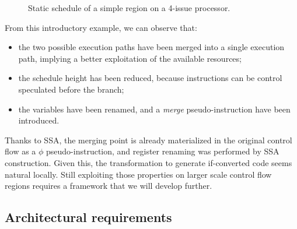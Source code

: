 \begin{figure}
\caption{Static schedule of a simple region on a 4-issue processor. }
\label{fig:example1}
\end{figure}

From this introductory example, we can observe that:
\begin{itemize}
\item the two possible execution paths have been merged into a single execution path, implying a  better exploitation of the available resources;  
\item the schedule height has been reduced, because instructions can be control speculated before the branch;
\item the variables have been renamed, and a \textit{merge} pseudo-instruction have been introduced.
\end{itemize}

Thanks to SSA, the merging point is already materialized in the original control flow as a $\phi$ pseudo-instruction, and register renaming was performed by SSA construction. Given this, the transformation to generate if-converted code seems natural locally. Still exploiting those properties on larger scale control flow regions requires a framework that we will develop further.

\subsection{Architectural requirements}


